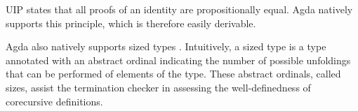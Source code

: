 UIP states that all proofs of an identity are propositionally
equal. Agda natively supports this principle, which is therefore easily derivable.
\begin{code}%
\>[0]\AgdaSpace{}%
\AgdaSymbol{:}\AgdaSpace{}%
\AgdaSymbol{\{}\AgdaSpace{}%
\AgdaSymbol{:}\AgdaSpace{}%
\AgdaSymbol{\}}\AgdaSpace{}%
\AgdaSymbol{\{}\AgdaSpace{}%
\AgdaSpace{}%
\AgdaSymbol{:}\AgdaSpace{}%
\AgdaSymbol{\}}\AgdaSpace{}%
\AgdaSymbol{\{}\AgdaSpace{}%
\AgdaSpace{}%
\AgdaSymbol{:}\AgdaSpace{}%
\AgdaSpace{}%
\AgdaSpace{}%
\AgdaSymbol{\}}\AgdaSpace{}%
\AgdaSpace{}%
\AgdaSpace{}%
\AgdaSpace{}%
\<%
\end{code}

Agda also natively supports sized types
\cite{A-sized,AVW-normalization}. Intuitively, a sized type is a type
annotated with an abstract ordinal indicating the number of possible
unfoldings that can be performed of elements of the type.  These
abstract ordinals, called sizes, assist the termination checker in
assessing the well-definedness of corecursive definitions.

